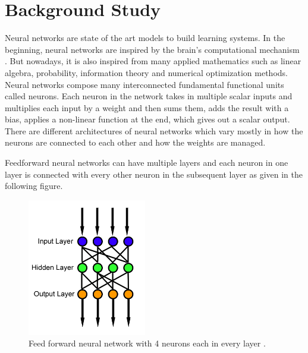 \documentclass[a4paper, 11pt]{article}
\begin{document}

\section{Background Study}

Neural networks are state of the art models to build learning systems. In the beginning, neural networks are inspired by the brain's computational mechanism \cite{McCulloch1943}. But nowadays, it is also inspired from many applied mathematics such as linear algebra, probability, information theory and numerical optimization methods\cite{Goodfellow2016}. Neural networks compose many interconnected fundamental functional units called neurons. Each neuron in the network takes in multiple scalar inputs and multiplies each input by a weight and then sums them, adds the result with a bias, applies a non-linear function at the end, which gives out a scalar output. There are different architectures of neural networks which vary mostly in how the neurons are connected to each other and how the weights are managed. 

Feedforward neural networks \cite{Svozil1997} can have multiple layers and each neuron in one layer is connected with every other neuron in the subsequent layer as given in the following figure. 

\begin{figure}[htpb]
    \centering
    \includegraphics[height=6cm,keepaspectratio=true]
    {Feed_forward_neural_net.png}
    \caption{
        Feed forward neural network with 4 neurons each in every layer \cite{WikipediaEN_FeedForward_Network}.
    }
    \label{fig:Feed forward neural network}
\end{figure}
\end{document}
